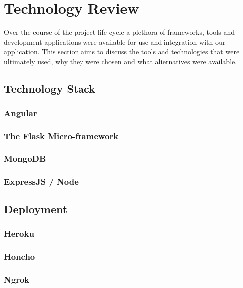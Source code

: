 \chapter{Technology Review}
Over the course of the project life cycle a plethora of frameworks, tools and development applications were available for use and integration with our application. This section aims to discuss the tools and technologies that were ultimately used, why they were chosen and what alternatives were available. 
\section{Technology Stack}
\subsection{Angular}
\subsection{The Flask Micro-framework}
\subsection{MongoDB}
\subsection{ExpressJS / Node}

\section{Deployment}
\subsection{Heroku}
\subsection{Honcho}
\subsection{Ngrok}
